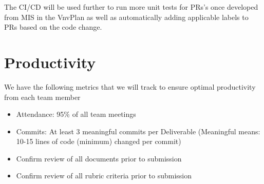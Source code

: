 \documentclass{article}
\begin{document}
The CI/CD will be used further to run more unit tests for PRs's once developed from MIS in the VnvPlan 
as well as automatically adding applicable labels to PRs based on the code change. 
\section{Productivity}
We have the following metrics that we will track to ensure optimal productivity from each team member

\begin{itemize}
    \item Attendance: 95\% of all team meetings
    \item Commits: At least 3 meaningful commits per Deliverable (Meaningful means: 10-15 lines of code (minimum) changed per commit)
    \item Confirm review of all documents prior to submission
    \item Confirm review of all rubric criteria prior to submission
  \end{itemize}
\end{document}
